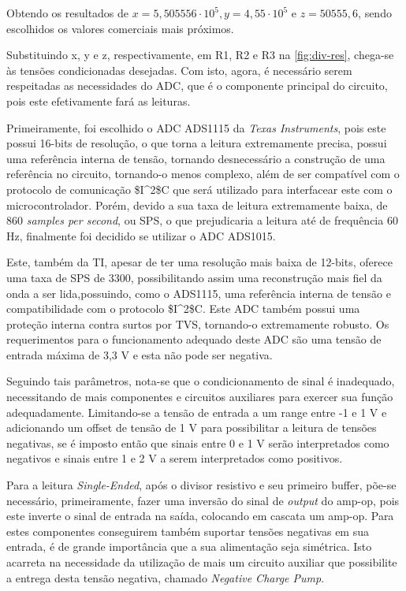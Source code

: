 Obtendo os resultados de $x = 5,505556 \cdot 10^{5}, y = 4,55 \cdot 10^{5}$ e $z = 50555,6$, sendo escolhidos os valores comerciais mais próximos.

Substituindo x, y e z, respectivamente, em R1, R2 e R3 na \autoref{fig:div-res}, chega-se às tensões condicionadas desejadas. Com isto, agora, é necessário serem respeitadas as necessidades do \gls{ADC}, que é o componente principal do circuito, pois este efetivamente fará as leituras.

Primeiramente, foi escolhido o \gls{ADC} ADS1115 da \textit{Texas Instruments}, pois este possui 16-bits de resolução, o que torna a leitura extremamente precisa, possui uma referência interna de tensão, tornando desnecessário a construção de uma referência no circuito, tornando-o menos complexo, além de ser compatível com o protocolo de comunicação \gls{$I^2$C} que será utilizado para interfacear este com o microcontrolador. Porém, devido a sua taxa de leitura extremamente baixa, de 860 \textit{samples per second}, ou \gls{SPS}, o que prejudicaria a leitura até de frequência 60 Hz, finalmente foi decidido se utilizar o \gls{ADC} ADS1015.

Este, também da \gls{TI}, apesar de ter uma resolução mais baixa de 12-bits, oferece uma taxa de \gls{SPS} de 3300, possibilitando assim uma reconstrução mais fiel da onda a ser lida,possuindo, como o ADS1115, uma referência interna de tensão e compatibilidade com o protocolo \gls{$I^2$C}. Este \gls{ADC} também possui uma proteção interna contra surtos por \gls{TVS}, tornando-o extremamente robusto. Os requerimentos para o funcionamento adequado deste \gls{ADC} são uma tensão de entrada máxima de 3,3 V e esta não pode ser negativa.

Seguindo tais parâmetros, nota-se que o condicionamento de sinal é inadequado, necessitando de mais componentes e circuitos auxiliares para exercer sua função adequadamente. Limitando-se a tensão de entrada a um range entre -1 e 1 V e adicionando um offset de tensão de 1 V para possibilitar a leitura de tensões negativas, se é imposto então que sinais entre 0 e 1 V serão interpretados como negativos e sinais entre 1 e 2 V a serem interpretados como positivos.

Para a leitura \textit{Single-Ended}, após o divisor resistivo e seu primeiro buffer, põe-se necessário, primeiramente, fazer uma inversão do sinal de \textit{output} do \gls{amp-op}, pois este inverte o sinal de entrada na saída, colocando em cascata um \gls{amp-op}. Para estes componentes conseguirem também suportar tensões negativas em sua entrada, é de grande importância que a sua alimentação seja simétrica. Isto acarreta na necessidade da utilização de mais um circuito auxiliar que possibilite a entrega desta tensão negativa, chamado \textit{Negative Charge Pump}.

